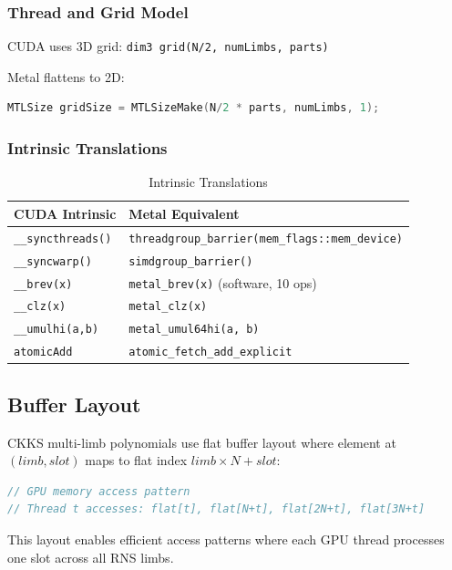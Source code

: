 \documentclass[11pt,oneside]{article}
\begin{document}
\subsubsection{Thread and Grid Model}

CUDA uses 3D grid: \texttt{dim3 grid(N/2, numLimbs, parts)}

Metal flattens to 2D:
\begin{lstlisting}[language=C++]
MTLSize gridSize = MTLSizeMake(N/2 * parts, numLimbs, 1);
\end{lstlisting}

\subsubsection{Intrinsic Translations}

\begin{table}[h]
\centering
\caption{Intrinsic Translations}
\begin{tabular}{ll}
\toprule
CUDA Intrinsic & Metal Equivalent \\
\midrule
\texttt{\_\_syncthreads()} & \texttt{threadgroup\_barrier(mem\_flags::mem\_device)} \\
\texttt{\_\_syncwarp()} & \texttt{simdgroup\_barrier()} \\
\texttt{\_\_brev(x)} & \texttt{metal\_brev(x)} (software, 10 ops) \\
\texttt{\_\_clz(x)} & \texttt{metal\_clz(x)} \\
\texttt{\_\_umulhi(a,b)} & \texttt{metal\_umul64hi(a, b)} \\
\texttt{atomicAdd} & \texttt{atomic\_fetch\_add\_explicit} \\
\bottomrule
\end{tabular}
\end{table}

\subsection{Buffer Layout}

CKKS multi-limb polynomials use flat buffer layout where element at $(limb, slot)$ maps to flat index $limb \times N + slot$:

\begin{lstlisting}[language=C++]
// GPU memory access pattern
// Thread t accesses: flat[t], flat[N+t], flat[2N+t], flat[3N+t]
\end{lstlisting}

This layout enables efficient access patterns where each GPU thread processes one slot across all RNS limbs.
\end{document}
